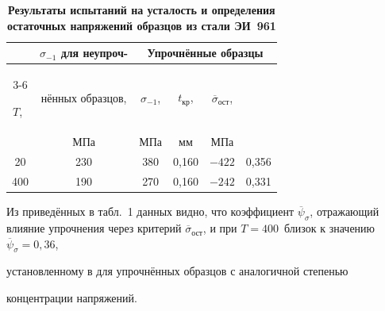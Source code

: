\begin{table} [h!] \centering

\begin{minipage}{.65\textwidth}

\centering \footnotesize \caption{\bf Результаты испытаний на усталость и определения остаточных напряжений образцов из стали ЭИ~961}\vspace{-3mm}

\begin{tabular}{c|c|c|c|c|c} \hline

                     & $\sigma_{-1}$ для неупроч-       & \multicolumn{4}{|c}{Упрочнённые образцы}  \\ \cline{3-6}

$T$, \,\textcelsius{}& нённых образцов,              & $\sigma_{-1}$, & $t_\text{кр}$, & $\overline{\sigma}_\text{ост}$, & \tobot{$\overline{\psi}_\sigma$} \\ %

                     &  МПа   & МПа            &  мм            & МПа                             &    \\ \hline

20                   &      230             &       380      & 0{,}160        &              $-422$               &   0{,}356 \\ 

400                  &      190             &       270      &  0{,}160       &              $-242$               &   0{,}331 \\ \hline

\end{tabular}

\end{minipage}

\end{table} 

\vspace{-3mm}



Из приведённых в табл.~1 данных видно, что коэффициент $\overline \psi

_\sigma$, отражающий влияние упрочнения через критерий $\overline \sigma

_\text{ост}$, и при $T=400$\,\textcelsius{} близок к значению \mbox{$\overline \psi _\sigma =0{,}36$},

установленному в \cite{kirpichev10:pavlov08} для упрочнённых образцов с аналогичной степенью

концентрации напряжений.



